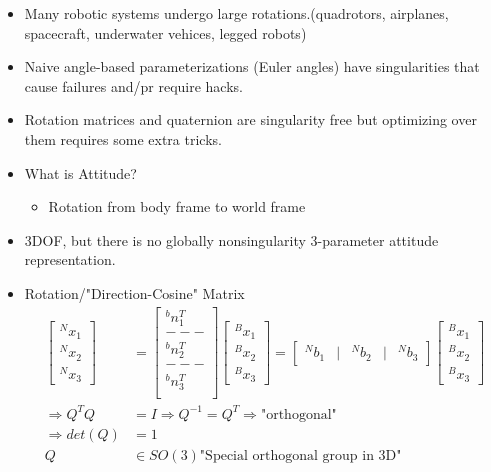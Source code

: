 \begin{itemize}
    \item Many robotic systems undergo large rotations.(quadrotors, airplanes, spacecraft, underwater vehices, legged robots)
    \item Naive angle-based parameterizations (Euler angles) have singularities that cause failures and/pr require hacks.
    \item Rotation matrices and quaternion are singularity free but optimizing over them requires some extra tricks.
    \item What is Attitude?
    \begin{itemize}
        \item Rotation from body frame to world frame
    \end{itemize}
    \item 3DOF, but there is no globally nonsingularity 3-parameter attitude representation.
    \item Rotation/"Direction-Cosine" Matrix
    \begin{align}
        \begin{bmatrix}
            ^N x_1 \\ ^N x_2 \\ ^N x_3
        \end{bmatrix} & = 
        \begin{bmatrix}
            ^b n_1^T \\ --- \\ ^b n_2^T \\ --- \\ ^b n_3^T \\ 
        \end{bmatrix}
        \begin{bmatrix}
            ^B x_1 \\ ^B x_2 \\ ^B x_3
        \end{bmatrix} = 
        \begin{bmatrix}
            ^N b_1 & | & ^N b_2 & | & ^N b_3 
        \end{bmatrix}
        \begin{bmatrix}
            ^B x_1 \\ ^B x_2 \\ ^B x_3
        \end{bmatrix} \\
        \Rightarrow Q^T Q & = I \Rightarrow Q^{-1} = Q^T \Rightarrow \text{"orthogonal"} \\
        \Rightarrow det(Q) & = 1 \\
        Q & \in SO(3) \text{"Special orthogonal group in 3D"}
    \end{align}
\end{itemize}

